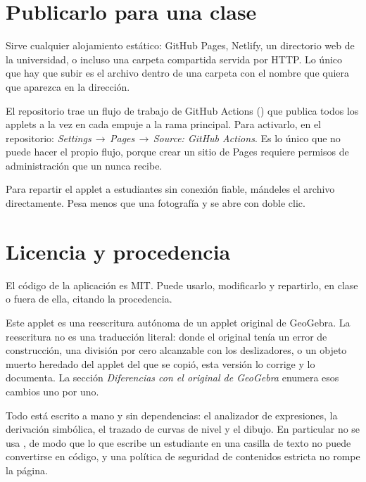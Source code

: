 
\section{Publicarlo para una clase}

Sirve cualquier alojamiento estático: GitHub Pages, Netlify, un directorio web
de la universidad, o incluso una carpeta compartida servida por HTTP. Lo único
que hay que subir es el archivo  dentro de una carpeta con el
nombre que quiera que aparezca en la dirección.

El repositorio trae un flujo de trabajo de GitHub Actions
() que publica todos los applets a la vez en
cada empuje a la rama principal. Para activarlo, en el repositorio:
\emph{Settings\,$\rightarrow$\,Pages\,$\rightarrow$\,Source: GitHub Actions}.
Es lo único que no puede hacer el propio flujo, porque crear un sitio de Pages
requiere permisos de administración que un  nunca recibe.

\begin{amnote}
Para repartir el applet a estudiantes sin conexión fiable, mándeles el archivo
 directamente. Pesa menos que una fotografía y se abre con
doble clic.
\end{amnote}

\section{Licencia y procedencia}

El código de la aplicación es MIT. Puede usarlo, modificarlo y repartirlo, en
clase o fuera de ella, citando la procedencia.

Este applet es una reescritura autónoma de un applet original de GeoGebra. La
reescritura no es una traducción literal: donde el original tenía un error de
construcción, una división por cero alcanzable con los deslizadores, o un objeto
muerto heredado del applet del que se copió, esta versión lo corrige y lo
documenta. La sección \emph{Diferencias con el original de GeoGebra} enumera
esos cambios uno por uno.

Todo está escrito a mano y sin dependencias: el analizador de expresiones, la
derivación simbólica, el trazado de curvas de nivel y el dibujo. En particular
no se usa , de modo que lo que escribe un estudiante en una casilla
de texto no puede convertirse en código, y una política de seguridad de
contenidos estricta no rompe la página.
